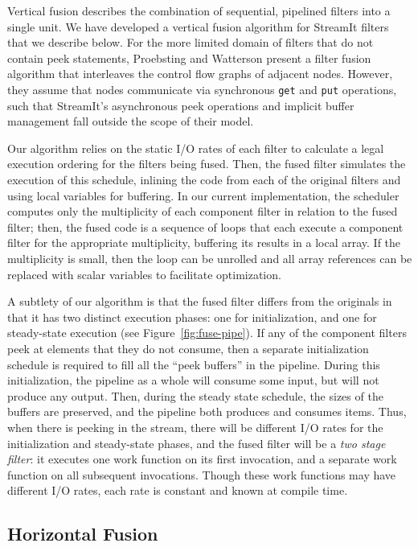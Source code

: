 Vertical fusion describes the combination of sequential, pipelined
filters into a single unit.  We have developed a vertical fusion
algorithm for StreamIt filters that we describe below.  For the more
limited domain of filters that do not contain peek statements,
Proebsting and Watterson \cite{pro96} present a filter fusion
algorithm that interleaves the control flow graphs of adjacent nodes.
However, they assume that nodes communicate via synchronous {\tt get}
and {\tt put} operations, such that StreamIt's asynchronous peek
operations and implicit buffer management fall outside the scope of
their model.

Our algorithm relies on the static I/O rates of each filter to
calculate a legal execution ordering for the filters being fused.
Then, the fused filter simulates the execution of this schedule,
inlining the code from each of the original filters and using local
variables for buffering.  In our current implementation, the scheduler
computes only the multiplicity of each component filter in relation to
the fused filter; then, the fused code is a sequence of loops that
each execute a component filter for the appropriate multiplicity,
buffering its results in a local array.  If the multiplicity is small,
then the loop can be unrolled and all array references can be replaced
with scalar variables to facilitate optimization.

A subtlety of our algorithm is that the fused filter differs from the
originals in that it has two distinct execution phases: one for
initialization, and one for steady-state execution (see
Figure~\ref{fig:fuse-pipe}).  If any of the component filters peek at
elements that they do not consume, then a separate initialization
schedule is required to fill all the ``peek buffers'' in the pipeline.
During this initialization, the pipeline as a whole will consume some
input, but will not produce any output.  Then, during the steady state
schedule, the sizes of the buffers are preserved, and the pipeline
both produces and consumes items.  Thus, when there is peeking in the
stream, there will be different I/O rates for the initialization and
steady-state phases, and the fused filter will be a {\it two stage
filter}: it executes one work function on its first invocation, and a
separate work function on all subsequent invocations.  Though these
work functions may have different I/O rates, each rate is constant and
known at compile time.

\subsection{Horizontal Fusion}

